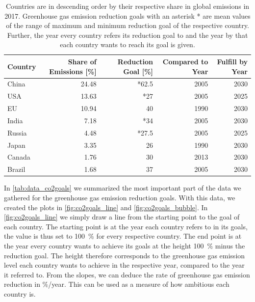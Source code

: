 \begin{table}[htb]
	\begin{center}
		\begin{tabular}{lrrrr}
			Country & Share of \ce{CO2} Emissions [\%] & Reduction Goal [\%] & Compared to Year & Fulfill by Year \\\midrule
			China & 24.48 & *62.5 & 2005 & 2030\\
			USA & 13.63 & *27 & 2005 & 2025\\
			EU & 10.94 & 40 & 1990 & 2030\\
			India & 7.18 & *34 & 2005 & 2030\\
			Russia & 4.48 & *27.5 & 2005 & 2025\\
			Japan & 3.35 & 26 & 1990 & 2030\\
			Canada & 1.76 & 30 & 2013 & 2030\\
			Brazil & 1.68 & 37 & 2005 & 2030\\
		\end{tabular}
		\caption{Countries are in descending order by their respective share in global  emissions in 2017. Greenhouse gas emission reduction goals with an asterisk * are mean values of the range of maximum and minimum reduction goal of the respective country. Further, the year every country refers its reduction goal to and the year by that each country wants to reach its goal is given.}
		\label{tab:data_co2goals}
	\end{center}
	
\end{table}

In \autoref{tab:data_co2goals} we summarized the most important part of the data we gathered for the greenhouse gas emission reduction goals. With this data, we created the plots in \autoref{fig:co2goals_line} and \autoref{fig:co2goals_bubble}. In \autoref{fig:co2goals_line} we simply draw a line from the starting point to the goal of each country. The starting point is at the year each country refers to in its goals, the value is thus set to \SI{100}{\percent} for every respective country. The end point is at the year every country wants to achieve its goals at the height \SI{100}{\percent} minus the reduction goal. The height therefore corresponds to the greenhouse gas emission level each country wants to achieve in the respective year, compared to the year it referred to. From the slopes, we can deduce the rate of greenhouse gas emission reduction in \%/year. This can be used as a measure of how ambitious each country is.

